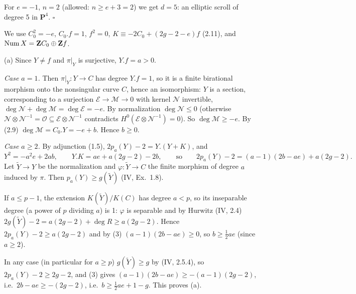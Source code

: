 \documentclass[11pt]{article}
\begin{document}
For $e=-1$, $n=2$ (allowed: $n\ge e+3=2$) we get $d=5$: an elliptic scroll of degree 5 in $\mathbf P^4$. \hfill$\square$

\pf
We use $C_0^2=-e$, $C_0.f=1$, $f^2=0$, $K\equiv-2C_0+(2g-2-e)f$ (2.11), and $\operatorname{Num}X=\mathbf Z C_0\oplus\mathbf Z f$.

(a) Since $Y\ne f$ and $\pi|_Y$ is surjective, $Y.f=a>0$.

\emph{Case $a=1$.} Then $\pi|_Y\colon Y\to C$ has degree $Y.f=1$, so it is a finite birational morphism onto the nonsingular curve $C$, hence an isomorphism: $Y$ is a section, corresponding to a surjection $\mathcal E\to\mathcal M\to0$ with kernel $\mathcal N$ invertible, $\deg\mathcal N+\deg\mathcal M=\deg\mathcal E=-e$. By normalization $\deg\mathcal N\le0$ (otherwise $\mathcal N\otimes\mathcal N^{-1}=\mathcal O\subseteq\mathcal E\otimes\mathcal N^{-1}$ contradicts $H^0(\mathcal E\otimes\mathcal N^{-1})=0$). So $\deg\mathcal M\ge-e$. By (2.9) $\deg\mathcal M=C_0.Y=-e+b$. Hence $b\ge0$.

\emph{Case $a\ge2$.} By adjunction (1.5), $2p_a(Y)-2=Y.(Y+K)$, and
\[ Y^2=-a^2e+2ab,\qquad Y.K=ae+a(2g-2)-2b,\qquad\text{so}\qquad 2p_a(Y)-2=(a-1)(2b-ae)+a(2g-2). \tag{3}\]
Let $\tilde Y\to Y$ be the normalization and $\varphi\colon\tilde Y\to C$ the finite morphism of degree $a$ induced by $\pi$. Then $p_a(Y)\ge g(\tilde Y)$ (IV, Ex.~1.8).

If $a\le p-1$, the extension $K(\tilde Y)/K(C)$ has degree $a<p$, so its inseparable degree (a power of $p$ dividing $a$) is 1: $\varphi$ is separable and by Hurwitz (IV, 2.4) $2g(\tilde Y)-2=a(2g-2)+\deg R\ge a(2g-2)$. Hence $2p_a(Y)-2\ge a(2g-2)$ and by (3) $(a-1)(2b-ae)\ge0$, so $b\ge\frac12ae$ (since $a\ge2$).

In any case (in particular for $a\ge p$) $g(\tilde Y)\ge g$ by (IV, 2.5.4), so $2p_a(Y)-2\ge2g-2$, and (3) gives $(a-1)(2b-ae)\ge-(a-1)(2g-2)$, i.e.\ $2b-ae\ge-(2g-2)$, i.e.\ $b\ge\frac12ae+1-g$. This proves (a).
\end{document}

